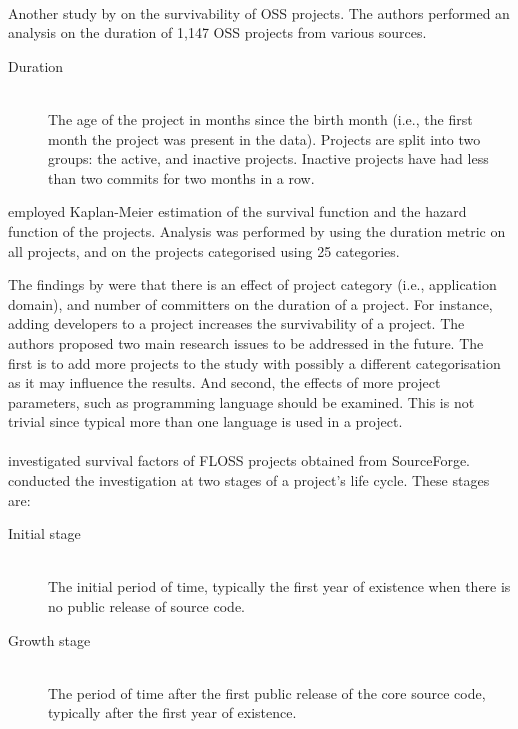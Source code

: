 \paragraph{}
Another study by \citet{samoladas2010} on the survivability of OSS projects.
The authors performed an analysis on the duration of 1,147 OSS projects from
various sources.

\begin{description}
	\item[Duration] \hfill \\ The age of the project in months since the birth
		month (i.e., the first month the project was present in the data). Projects
		are split into two groups: the active, and inactive projects. Inactive
		projects have had less than two commits for two months in a row.
\end{description}

\noindent
\citeauthor{samoladas2010} employed Kaplan-Meier estimation of the survival
function and the hazard function of the projects. Analysis was performed by
using the duration metric on all projects, and on the projects categorised
using 25 categories.

The findings by \citeauthor{samoladas2010} were that there is an effect of
project category (i.e., application domain), and number of committers on the
duration of a project. For instance, adding developers to a project increases
the survivability of a project. The authors proposed two main research issues to
be addressed in the future. The first is to add more projects to the study with
possibly a different categorisation as it may influence the results. And second,
the effects of more project parameters, such as programming language should be
examined. This is not trivial since typical more than one language is used in a
project.

\paragraph{}
\citet{wang2012} investigated survival factors of FLOSS projects obtained from
SourceForge. \citeauthor{wang2012} conducted the investigation at two stages
of a project's life cycle. These stages are:

\begin{description}
	\item[Initial stage] \hfill \\ The initial period of time, typically the first
		year of existence when there is no public release of source code.
	
	\item[Growth stage] \hfill \\ The period of time after the first public release
		of the core source code, typically after the first year of existence.
\end{description}

